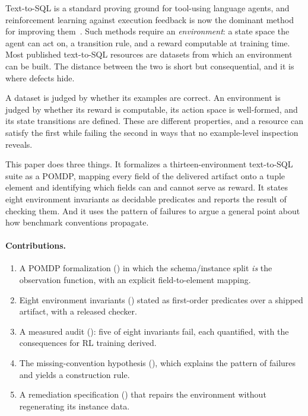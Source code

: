 \documentclass[11pt,letterpaper]{article}
\theoremstyle{definition}
\theoremstyle{plain}
\theoremstyle{remark}
\begin{document}
Text-to-SQL is a standard proving ground for tool-using language agents, and reinforcement
learning against execution feedback is now the dominant method for improving
them~\cite{pourreza2025reasoningsql,zhang2025rewardsql,graphrewardsql2025}. Such methods
require an \emph{environment}: a state space the agent can act on, a transition rule, and a
reward computable at training time. Most published text-to-SQL resources are datasets from
which an environment can be built. The distance between the two is short but consequential,
and it is where defects hide.

A dataset is judged by whether its examples are correct. An environment is judged by whether
its reward is computable, its action space is well-formed, and its state transitions are
defined. These are different properties, and a resource can satisfy the first while failing
the second in ways that no example-level inspection reveals.

This paper does three things. It formalizes a thirteen-environment text-to-SQL suite as a
POMDP, mapping every field of the delivered artifact onto a tuple element and identifying
which fields can and cannot serve as reward. It states eight environment invariants as
decidable predicates and reports the result of checking them. And it uses the pattern of
failures to argue a general point about how benchmark conventions propagate.

\paragraph{Contributions.}
\begin{enumerate}[leftmargin=1.5em,itemsep=2pt,topsep=3pt]
  \item A POMDP formalization () in which the schema/instance split
        \emph{is} the observation function, with an explicit field-to-element mapping.
  \item Eight environment invariants () stated as first-order predicates
        over a shipped artifact, with a released checker.
  \item A measured audit (): five of eight invariants fail, each quantified,
        with the consequences for RL training derived.
  \item The missing-convention hypothesis (), which explains the pattern
        of failures and yields a construction rule.
  \item A remediation specification () that repairs the environment
        without regenerating its instance data.
\end{enumerate}
\end{document}
